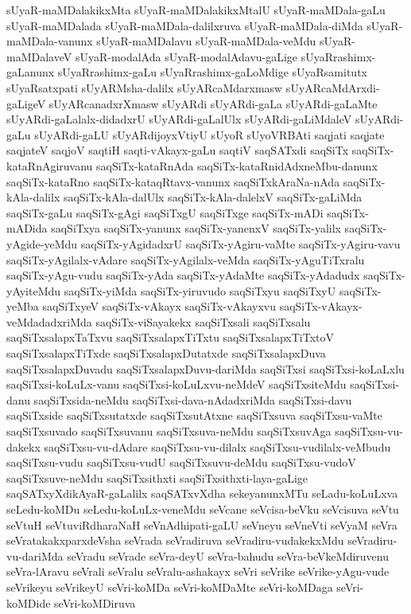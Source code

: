 {sUyaR-maMDalakikxMta
sUyaR-maMDalakikxMtalU
sUyaR-maMDala-gaLu
sUyaR-maMDalada
sUyaR-maMDala-dalilxruva
sUyaR-maMDala-diMda
sUyaR-maMDala-vanunx
sUyaR-maMDalavu
sUyaR-maMDala-veMdu
sUyaR-maMDalaveV
sUyaR-modalAda
sUyaR-modalAdavu-gaLige
sUyaRrashimx-gaLanunx
sUyaRrashimx-gaLu
sUyaRrashimx-gaLoMdige
sUyaRsamitutx
sUyaRsatxpati
sUyARMsha-dalilx
sUyARcaMdarxmasw
sUyARcaMdArxdi-gaLigeV
sUyARcanadxrXmasw
sUyARdi
sUyARdi-gaLa
sUyARdi-gaLaMte
sUyARdi-gaLalalx-didadxrU
sUyARdi-gaLalUlx
sUyARdi-gaLiMdaleV
sUyARdi-gaLu
sUyARdi-gaLU
sUyARdijoyxVtiyU
sUyoR
sUyoVRBAti
saqjati
saqjate
saqjateV
saqjoV
saqtiH
saqti-vAkayx-gaLu
saqtiV
saqSATxdi
saqSiTx
saqSiTx-kataRnAgiruvanu
saqSiTx-kataRnAda
saqSiTx-kataRnidAdxneMbu-danunx
saqSiTx-kataRno
saqSiTx-kataqRtavx-vanunx
saqSiTxkAraNa-nAda
saqSiTx-kAla-dalilx
saqSiTx-kAla-dalUlx
saqSiTx-kAla-dalelxV
saqSiTx-gaLiMda
saqSiTx-gaLu
saqSiTx-gAgi
saqSiTxgU
saqSiTxge
saqSiTx-mADi
saqSiTx-mADida
saqSiTxya
saqSiTx-yanunx
saqSiTx-yanenxV
saqSiTx-yalilx
saqSiTx-yAgide-yeMdu
saqSiTx-yAgidadxrU
saqSiTx-yAgiru-vaMte
saqSiTx-yAgiru-vavu
saqSiTx-yAgilalx-vAdare
saqSiTx-yAgilalx-veMda
saqSiTx-yAguTiTxralu
saqSiTx-yAgu-vudu
saqSiTx-yAda
saqSiTx-yAdaMte
saqSiTx-yAdadudx
saqSiTx-yAyiteMdu
saqSiTx-yiMda
saqSiTx-yiruvudo
saqSiTxyu
saqSiTxyU
saqSiTx-yeMba
saqSiTxyeV
saqSiTx-vAkayx
saqSiTx-vAkayxvu
saqSiTx-vAkayx-veMdadadxriMda
saqSiTx-viSayakekx
saqSiTxsali
saqSiTxsalu
saqSiTxsalapxTaTxvu
saqSiTxsalapxTiTxtu
saqSiTxsalapxTiTxtoV
saqSiTxsalapxTiTxde
saqSiTxsalapxDutatxde
saqSiTxsalapxDuva
saqSiTxsalapxDuvadu
saqSiTxsalapxDuvu-dariMda
saqSiTxsi
saqSiTxsi-koLaLxlu
saqSiTxsi-koLuLx-vanu
saqSiTxsi-koLuLxvu-neMdeV
saqSiTxsiteMdu
saqSiTxsi-danu
saqSiTxsida-neMdu
saqSiTxsi-dava-nAdadxriMda
saqSiTxsi-davu
saqSiTxside
saqSiTxsutatxde
saqSiTxsutAtxne
saqSiTxsuva
saqSiTxsu-vaMte
saqSiTxsuvado
saqSiTxsuvanu
saqSiTxsuva-neMdu
saqSiTxsuvAga
saqSiTxsu-vu-dakekx
saqSiTxsu-vu-dAdare
saqSiTxsu-vu-dilalx
saqSiTxsu-vudilalx-veMbudu
saqSiTxsu-vudu
saqSiTxsu-vudU
saqSiTxsuvu-deMdu
saqSiTxsu-vudoV
saqSiTxsuve-neMdu
saqSiTxsithxti
saqSiTxsithxti-laya-gaLige
saqSATxyXdikAyaR-gaLalilx
saqSATxvXdha
sekeyanunxMTu
seLadu-koLuLxva
seLedu-koMDu
seLedu-koLuLx-veneMdu
seVcane
seVcisa-beVku
seVcisuva
seVtu
seVtuH
seVtuviRdharaNaH
seVnAdhipati-gaLU
seVneyu
seVneVti
seVyaM
seVra
seVratakakxparxdeVsha
seVrada
seVradiruva
seVradiru-vudakekxMdu
seVradiru-vu-dariMda
seVradu
seVrade
seVra-deyU
seVra-bahudu
seVra-beVkeMdiruvenu
seVra-lAravu
seVrali
seVralu
seVralu-ashakayx
seVri
seVrike
seVrike-yAgu-vude
seVrikeyu
seVrikeyU
seVri-koMDa
seVri-koMDaMte
seVri-koMDaga
seVri-koMDide
seVri-koMDiruva
}
